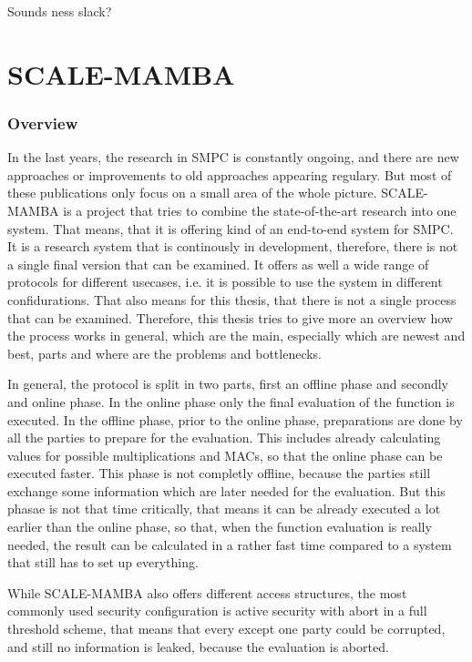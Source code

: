 \documentclass[english,runningheads,a4paper]{llncs}[2018/03/10]
\begin{document}
Sounds ness slack?


\section{SCALE-MAMBA}\label{sec:scalemamba}

\subsubsection{Overview}

In the last years, the research in SMPC is constantly ongoing, and there are new approaches or improvements to old approaches appearing regulary. But most of these publications only focus on a small area of the whole picture. SCALE-MAMBA is a project that tries to combine the state-of-the-art research into one system. That means, that it is offering kind of an end-to-end system for SMPC.
It is a research system that is continously in development, therefore, there is not a single final version that can be examined. It offers as well a wide range of protocols for different usecases, i.e. it is possible to use the system in different confidurations. That also means for this thesis, that there is not a single process that can be examined. Therefore, this thesis tries to give more an overview how the process works in general, which are the main, especially which are newest and best, parts and where are the problems and bottlenecks.
 
In general, the protocol is split in two parts, first an offline phase and secondly and online phase. In the online phase only the final evaluation of the function is executed. In the offline phase, prior to the online phase, preparations are done by all the parties to prepare for the evaluation. This includes already calculating values for possible multiplications and MACs, so that the online phase can be executed faster. This phase is not completly offline, because the parties still exchange some information which are later needed for the evaluation. But this phasae is not that time critically, that means it can be already executed a lot earlier than the online phase, so that, when the function evaluation is really needed, the result can be calculated in a rather fast time compared to a system that still has to set up everything.

While SCALE-MAMBA also offers different access structures, the most commonly used security configuration is active security with abort in a full threshold scheme, that means that every except one party could be corrupted, and still no information is leaked, because the evaluation is aborted.
\end{document}
